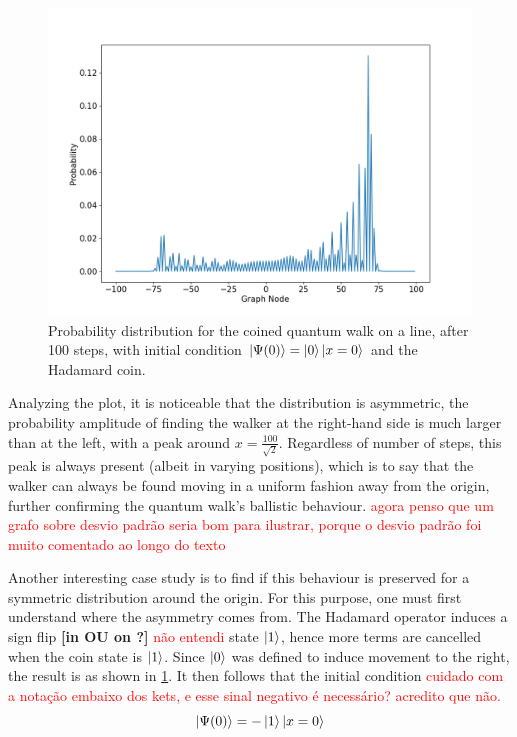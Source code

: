     	        \begin{figure}[!h]
                    \centering
                    \includegraphics[scale=0.40]{img/CoinedQW/Coinedpsi00.png}
                    \caption{Probability distribution for the coined quantum walk on a line, after 100 steps, with initial condition $\ket{\Psi(0)}=\ket{0}\ket{x=0}$ and the Hadamard coin.} 
                    \label{fig:fig1}
                \end{figure}
                
                Analyzing the plot, it is noticeable that the distribution is asymmetric, the probability amplitude of finding the walker at the right-hand side is much larger than at the left, with a peak around $x=\frac{100}{\sqrt{2}}$. Regardless of number of steps, this peak is always present (albeit in varying positions), which is to say that the walker can always be found moving in a uniform fashion away from the origin, further confirming the quantum walk's ballistic behaviour. \textcolor{red}{agora penso que um grafo sobre desvio padrão seria bom para ilustrar, porque o desvio padrão foi muito comentado ao longo do texto}\par
                Another interesting case study is to find if this behaviour is preserved for a symmetric distribution around the origin. For this purpose, one must first understand where the asymmetry comes from. The Hadamard operator induces a sign flip \textbf{[in OU on ?]} \textcolor{red}{não entendi} state $\ket{1}$, hence more terms are cancelled when the coin state is $\ket{1}$. Since $\ket{0}$ was defined to induce movement to the right, the result is as shown in \ref{fig:fig1}. It then follows that the initial condition \textcolor{red}{cuidado com a notação embaixo dos kets, e esse sinal negativo é necessário? acredito que não.}
                \begin{equation}
                    \ket{\Psi(0)} = -\ket{1}\ket{x=0}
                    \label{eq:12}
                \end{equation}
                
